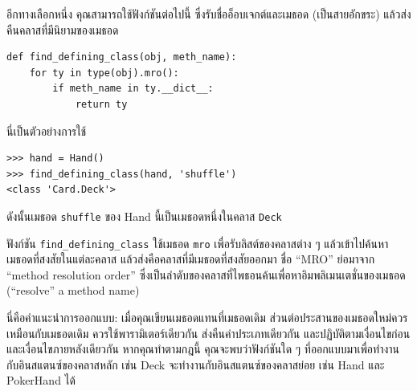 อีกทางเลือกหนึ่ง คุณสามารถใช้ฟังก์ชันต่อไปนี้ ซึ่งรับชื่ออ็อบเจกต์และเมธอด (เป็นสายอักขระ) แล้วส่งคืนคลาสที่มีนิยามของเมธอด

\begin{verbatim}
def find_defining_class(obj, meth_name):
    for ty in type(obj).mro():
        if meth_name in ty.__dict__:
            return ty
\end{verbatim}
%
นี่เป็นตัวอย่างการใช้

\begin{verbatim}
>>> hand = Hand()
>>> find_defining_class(hand, 'shuffle')
<class 'Card.Deck'>
\end{verbatim}
%

ดังนั้นเมธอด {\tt shuffle} ของ  Hand นี้เป็นเมธอดหนึ่งในคลาส {\tt Deck}



ฟังก์ชัน \verb"find_defining_class" ใช้เมธอด {\tt mro} เพื่อรับลิสต์ของคลาสต่าง ๆ แล้วเข้าไปค้นหาเมธอดที่สงสัยในแต่ละคลาส
แล้วส่งคือคลาสที่มีเมธอดที่สงสัยออกมา
ชื่อ ``MRO'' ย่อมาจาก ``method resolution order'' ซึ่งเป็นลำดับของคลาสที่ไพธอนค้นเพื่อหาอิมพลิเมนเตชั่นของเมธอด (``resolve'' a method name)



นี่คือคำแนะนำการออกแบบ: 
เมื่อคุณเขียนเมธอดแทนที่เมธอดเดิม
ส่วนต่อประสานของเมธอดใหม่ควรเหมือนกับเมธอดเดิม ควรใช้พารามิเตอร์เดียวกัน ส่งคืนค่าประเภทเดียวกัน และปฏิบัติตามเงื่อนไขก่อนและเงื่อนไขภายหลังเดียวกัน 
หากคุณทำตามกฎนี้ คุณจะพบว่าฟังก์ชันใด ๆ ที่ออกแบบมาเพื่อทำงานกับอินสแตนซ์ของคลาสหลัก เช่น Deck จะทำงานกับอินสแตนซ์ของคลาสย่อย เช่น Hand และ PokerHand ได้

